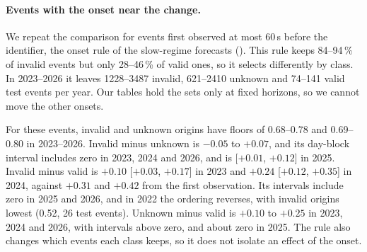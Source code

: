 \paragraph{Events with the onset near the change.}
We repeat the comparison for events first observed at most 60\,s before the identifier, the onset rule of the slow-regime forecasts ().
This rule keeps 84--94\,\% of invalid events but only 28--46\,\% of valid ones, so it selects differently by class.
In 2023--2026 it leaves \num{1228}--\num{3487} invalid, 621--\num{2410} unknown and 74--141 valid test events per year.
Our tables hold the sets only at fixed horizons, so we cannot move the other onsets.

For these events, invalid and unknown origins have floors of 0.68--0.78 and 0.69--0.80 in 2023--2026.
Invalid minus unknown is $-0.05$ to $+0.07$, and its day-block interval includes zero in 2023, 2024 and 2026, and is [$+0.01$, $+0.12$] in 2025.
Invalid minus valid is $+0.10$ [$+0.03$, $+0.17$] in 2023 and $+0.24$ [$+0.12$, $+0.35$] in 2024, against $+0.31$ and $+0.42$ from the first observation.
Its intervals include zero in 2025 and 2026, and in 2022 the ordering reverses, with invalid origins lowest (0.52, 26 test events).
Unknown minus valid is $+0.10$ to $+0.25$ in 2023, 2024 and 2026, with intervals above zero, and about zero in 2025.
The rule also changes which events each class keeps, so it does not isolate an effect of the onset.

